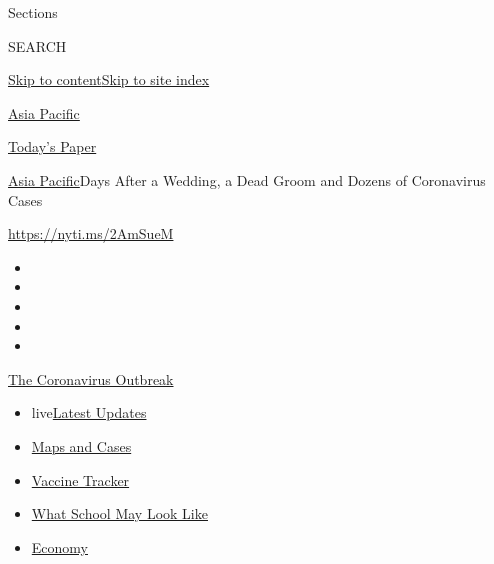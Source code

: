 Sections

SEARCH

\protect\hyperlink{site-content}{Skip to
content}\protect\hyperlink{site-index}{Skip to site index}

\href{https://www.nytimes.com/section/world/asia}{Asia Pacific}

\href{https://myaccount.nytimes.com/auth/login?response_type=cookie\&client_id=vi}{}

\href{https://www.nytimes.com/section/todayspaper}{Today's Paper}

\href{/section/world/asia}{Asia Pacific}\textbar{}Days After a Wedding,
a Dead Groom and Dozens of Coronavirus Cases

\url{https://nyti.ms/2AmSueM}

\begin{itemize}
\item
\item
\item
\item
\item
\end{itemize}

\href{https://www.nytimes.com/news-event/coronavirus?action=click\&pgtype=Article\&state=default\&region=TOP_BANNER\&context=storylines_menu}{The
Coronavirus Outbreak}

\begin{itemize}
\tightlist
\item
  live\href{https://www.nytimes.com/2020/08/02/world/coronavirus-updates.html?action=click\&pgtype=Article\&state=default\&region=TOP_BANNER\&context=storylines_menu}{Latest
  Updates}
\item
  \href{https://www.nytimes.com/interactive/2020/us/coronavirus-us-cases.html?action=click\&pgtype=Article\&state=default\&region=TOP_BANNER\&context=storylines_menu}{Maps
  and Cases}
\item
  \href{https://www.nytimes.com/interactive/2020/science/coronavirus-vaccine-tracker.html?action=click\&pgtype=Article\&state=default\&region=TOP_BANNER\&context=storylines_menu}{Vaccine
  Tracker}
\item
  \href{https://www.nytimes.com/interactive/2020/07/29/us/schools-reopening-coronavirus.html?action=click\&pgtype=Article\&state=default\&region=TOP_BANNER\&context=storylines_menu}{What
  School May Look Like}
\item
  \href{https://www.nytimes.com/live/2020/07/31/business/stock-market-today-coronavirus?action=click\&pgtype=Article\&state=default\&region=TOP_BANNER\&context=storylines_menu}{Economy}
\end{itemize}

